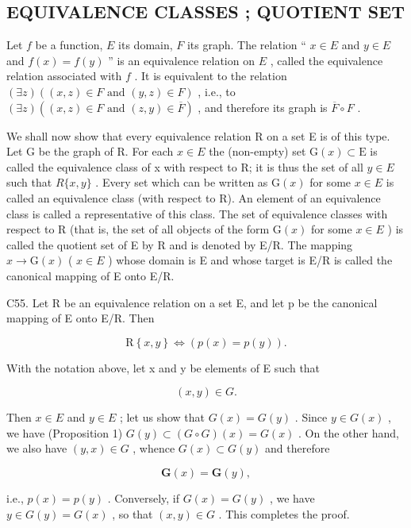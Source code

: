 \subsection{EQUIVALENCE CLASSES ; QUOTIENT SET}

Let \(f\) be a function, \(E\) its domain, \(F\) its graph. The relation `` \(x \in E\) and \(y \in E\) and \(f(x) = f(y)\) '' is an equivalence relation on \(E\) , called the equivalence relation associated with \(f\) . It is equivalent to the relation \((\exists z)((x, z) \in F \text{ and } (y, z) \in F)\) , i.e., to \((\exists z)((x, z) \in F \text{ and } (z, y) \in \overline{F})\) , and therefore its graph is \(\overline{F} \circ F\) .

We shall now show that every equivalence relation R on a set E is of this type. Let G be the graph of R. For each \(x \in E\) the (non-empty) set \(\mathrm{G}(x) \subset \mathrm{E}\) is called the equivalence class of x with respect to R; it is thus the set of all \(y \in E\) such that \(R\{x, y\}\) . Every set which can be written as \(\mathrm{G}(x)\) for some \(x \in E\) is called an equivalence class (with respect to R). An element of an equivalence class is called a representative of this class. The set of equivalence classes with respect to R (that is, the set of all objects of the form \(\mathrm{G}(x)\) for some \(x \in E\) ) is called the quotient set of E by R and is denoted by E/R. The mapping \(x \to \mathrm{G}(x)\) ( \(x \in E\) ) whose domain is E and whose target is E/R is called the canonical mapping of E onto E/R.

C55. Let R be an equivalence relation on a set E, and let p be the canonical mapping of E onto E/R. Then

\[
\mathrm{R} \left\{x, y \right\} \Longleftrightarrow (p (x) = p (y)).
\]

With the notation above, let x and y be elements of E such that

\[
(x, y) \in G.
\]

Then \(x \in E\) and \(y \in E\) ; let us show that \(G(x) = G(y)\) . Since \(y \in G(x)\) , we have (Proposition 1) \(G(y) \subset (G \circ G)(x) = G(x)\) . On the other hand, we also have \((y, x) \in G\) , whence \(G(x) \subset G(y)\) and therefore

\[
\mathbf {G} (x) = \mathbf {G} (y),
\]

i.e., \(p(x) = p(y)\) . Conversely, if \(G(x) = G(y)\) , we have \(y \in G(y) = G(x)\) , so that \((x, y) \in G\) . This completes the proof.

